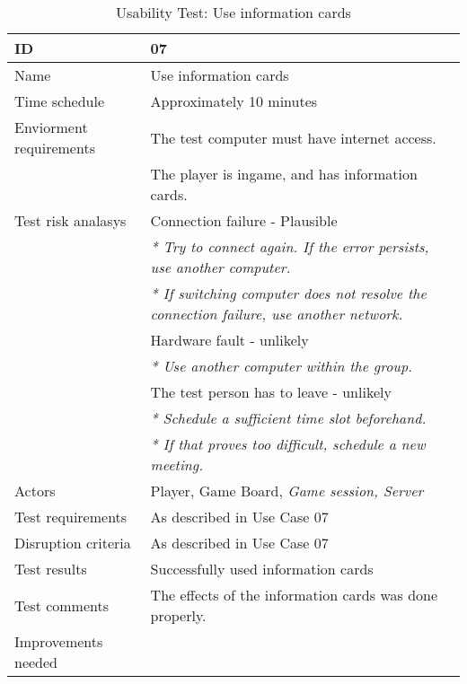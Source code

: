 {\footnotesize
\begin{table}[H]
\begin{tabular}{| p{5cm} | p{10cm} |}\hline
	\textbf{ID}	& \textbf{07} \\ \hline
	Name		& Use information cards\\ \hline
	Time schedule	& Approximately 10 minutes\\ \hline
	Enviorment requirements 
		& The test computer must have internet access. \\ 
		& The player is ingame, and has information cards.\\ \hline
	Test risk analasys 
		& Connection failure - Plausible \\
		& \emph{* Try to connect again. If the error persists, use another computer.} \\
		& \emph{* If switching computer does not resolve the connection failure, use another network.}\\
		& Hardware fault - unlikely \\
		& \emph{* Use another computer within the group.} \\
		& The test person has to leave - unlikely \\
		& \emph{* Schedule a sufficient time slot beforehand.} \\
		& \emph{* If that proves too difficult, schedule a new meeting.}\\ \hline
	Actors	& Player, Game Board, \emph{Game session, Server}\\ \hline
	Test requirements & As described in Use Case 07 \\ \hline
	Disruption criteria & As described in Use Case 07  \\ \hline
	Test results & Successfully used information cards
		& \\ \hline
	Test comments & The effects of the information cards was done properly. 
		& \\ \hline
	Improvements needed
		& \\ \hline
\end{tabular}


\caption{Usability Test: Use information cards}
\label{fig:usability_test_7}
\end{table}}


